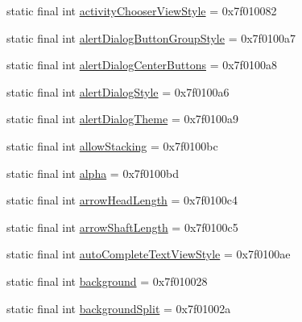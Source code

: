 \begin{CompactItemize}
\item 
static final int \hyperlink{classandroid_1_1support_1_1graphics_1_1drawable_1_1animated_1_1_r_1_1attr_8867c51af861e1508d37d4825402137d}{activityChooserViewStyle} = 0x7f010082
\item 
static final int \hyperlink{classandroid_1_1support_1_1graphics_1_1drawable_1_1animated_1_1_r_1_1attr_535b0ef16b7140bcfb6f40fbbb24ec9f}{alertDialogButtonGroupStyle} = 0x7f0100a7
\item 
static final int \hyperlink{classandroid_1_1support_1_1graphics_1_1drawable_1_1animated_1_1_r_1_1attr_ac0e0f41c8f9e7ae04be22df892bb49d}{alertDialogCenterButtons} = 0x7f0100a8
\item 
static final int \hyperlink{classandroid_1_1support_1_1graphics_1_1drawable_1_1animated_1_1_r_1_1attr_bb1736799b85965c2a39d07c5024e5af}{alertDialogStyle} = 0x7f0100a6
\item 
static final int \hyperlink{classandroid_1_1support_1_1graphics_1_1drawable_1_1animated_1_1_r_1_1attr_d67124e62eb32b2ea41cff9f3dcd9f85}{alertDialogTheme} = 0x7f0100a9
\item 
static final int \hyperlink{classandroid_1_1support_1_1graphics_1_1drawable_1_1animated_1_1_r_1_1attr_e649184241ecb1160427b77bbd04fdde}{allowStacking} = 0x7f0100bc
\item 
static final int \hyperlink{classandroid_1_1support_1_1graphics_1_1drawable_1_1animated_1_1_r_1_1attr_9363b95d23f8b98c950c15c2d71554e4}{alpha} = 0x7f0100bd
\item 
static final int \hyperlink{classandroid_1_1support_1_1graphics_1_1drawable_1_1animated_1_1_r_1_1attr_966beb18d3d304051bc5dcee77f9d599}{arrowHeadLength} = 0x7f0100c4
\item 
static final int \hyperlink{classandroid_1_1support_1_1graphics_1_1drawable_1_1animated_1_1_r_1_1attr_cc1a11732ae6e22cce8e95874c44a78c}{arrowShaftLength} = 0x7f0100c5
\item 
static final int \hyperlink{classandroid_1_1support_1_1graphics_1_1drawable_1_1animated_1_1_r_1_1attr_ba0ff3ef1eca9052d07d217d3f62db8f}{autoCompleteTextViewStyle} = 0x7f0100ae
\item 
static final int \hyperlink{classandroid_1_1support_1_1graphics_1_1drawable_1_1animated_1_1_r_1_1attr_31244c889efe0054b4cf6a99932a8e9d}{background} = 0x7f010028
\item 
static final int \hyperlink{classandroid_1_1support_1_1graphics_1_1drawable_1_1animated_1_1_r_1_1attr_67a5ddcfc7fdaf85312f23aa7944d1c2}{backgroundSplit} = 0x7f01002a
\item 

\end{CompactItemize}

